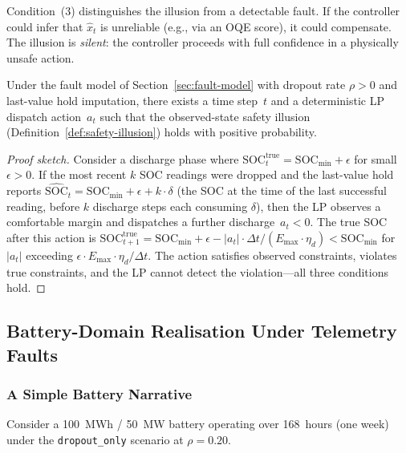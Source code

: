 Condition~(3) distinguishes the illusion from a detectable fault.  If the
controller could infer that $\hat{x}_t$ is unreliable (e.g., via an OQE
score), it could compensate.  The illusion is \emph{silent}: the
controller proceeds with full confidence in a physically unsafe action.

\begin{theorem}
\label{thm:illusion-existence}
Under the fault model of Section~\ref{sec:fault-model} with dropout
rate $\rho > 0$ and last-value hold imputation, there exists a time
step~$t$ and a deterministic LP dispatch action~$a_t$ such that the
observed-state safety illusion (Definition~\ref{def:safety-illusion})
holds with positive probability.
\end{theorem}

\begin{proof}[Proof sketch]
Consider a discharge phase where
$\mathrm{SOC}_t^{\mathrm{true}} = \mathrm{SOC}_{\min} + \epsilon$ for
small $\epsilon > 0$.  If the most recent $k$ SOC readings were dropped
and the last-value hold reports
$\widehat{\mathrm{SOC}}_t = \mathrm{SOC}_{\min} + \epsilon + k \cdot
\delta$ (the SOC at the time of the last successful reading, before $k$
discharge steps each consuming $\delta$), then the LP observes a
comfortable margin and dispatches a further discharge~$a_t < 0$.  The
true SOC after this action is
$\mathrm{SOC}_{t+1}^{\mathrm{true}} = \mathrm{SOC}_{\min} + \epsilon -
|a_t| \cdot \Delta t / (E_{\max} \cdot \eta_d) < \mathrm{SOC}_{\min}$
for $|a_t|$ exceeding $\epsilon \cdot E_{\max} \cdot \eta_d / \Delta t$.
The action satisfies observed constraints, violates true constraints, and
the LP cannot detect the violation---all three conditions hold.
\end{proof}

\subsection{Battery-Domain Realisation Under Telemetry Faults}
\label{sec:battery-narrative}

\subsubsection{A Simple Battery Narrative}

Consider a 100~MWh / 50~MW battery operating over 168~hours (one week)
under the \texttt{dropout\_only} scenario at $\rho = 0.20$.

